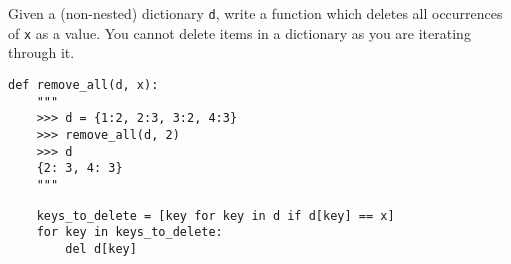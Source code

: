 \question Given a (non-nested) dictionary {\tt d}, write a function which deletes all occurrences of {\tt x} as a value. You cannot delete items in a dictionary as you are iterating through it.
\begin{lstlisting}
def remove_all(d, x):
    """
    >>> d = {1:2, 2:3, 3:2, 4:3}
    >>> remove_all(d, 2)
    >>> d
    {2: 3, 4: 3}
    """
\end{lstlisting}
\begin{solution}[0.8in]
\begin{lstlisting}
    keys_to_delete = [key for key in d if d[key] == x]
    for key in keys_to_delete:
        del d[key]
\end{lstlisting}
\end{solution}
